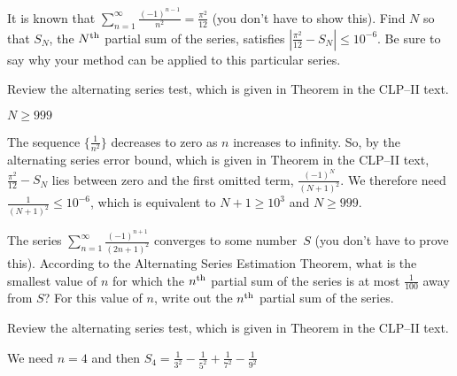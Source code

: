 \begin{Mquestion}[2016Q5]
It is known that $\displaystyle \sum_{n=1}^\infty \frac{(-1)^{n-1}}{n^2} = \frac{\pi^2}{12}$
(you don't have to show this).
Find $N$ so that $S_N$, the $N^{\rm th}$ partial sum of the series, satisfies
$| \frac{\pi^2}{12} - S_N | \le 10^{-6}$. Be sure to say why your method can be
applied to this particular series.
\end{Mquestion}

\begin{hint}
Review the alternating series test, which is given in
Theorem  in the
CLP--II text.
\end{hint}

\begin{answer}
$N\geq 999$
\end{answer}

\begin{solution}
The sequence $\{\frac{1}{n^2}\}$ decreases to zero as $n$ increases to infinity.
So, by the alternating series error bound, which is given in
Theorem  in the
CLP--II text, $\frac{\pi^2}{12}-S_N$ lies between zero and
the first omitted term, $ \frac{(-1)^{N}}{(N+1)^2}$.
We therefore need $\frac{1}{(N+1)^2} \leq 10^{-6}$,
which is equivalent to $N+1 \geq 10^3$ and $N\geq 999$.
\end{solution}




\begin{question}[2015A]
The series $\displaystyle \sum_{n=1}^\infty \frac{(-1)^{n+1}}{(2n+1)^2}$ converges to some number~$S$ (you don't have to prove this). According to the Alternating Series Estimation Theorem, what is the smallest value of $n$ for which the $n^{\rm th}$
partial sum of the series is at most $\frac1{100}$ away from $S$? For this value of $n$,
write out the $n^{\rm th}$ partial sum of the series.
\end{question}

\begin{hint}
Review the alternating series test, which is given in
Theorem  in the
CLP--II text.
\end{hint}

\begin{answer}
We need  $n=4$ and then
$
   S_4= \frac{1}{3^2}-\frac{1}{5^2} +\frac{1}{7^2} -\frac{1}{9^2}
$
\end{answer}

